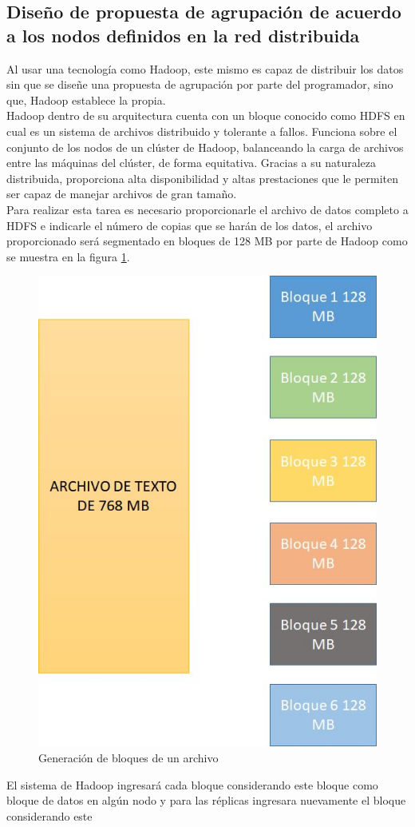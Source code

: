 \subsection{Diseño de propuesta de agrupación de acuerdo a los nodos definidos en la red distribuida}

Al usar una tecnología como Hadoop, este mismo es capaz de distribuir los datos sin que se diseñe una
propuesta de agrupación por parte del programador, sino que, Hadoop establece la propia.
\\
Hadoop dentro de su arquitectura cuenta con un bloque conocido como HDFS en cual es un sistema de archivos distribuido y tolerante a fallos. Funciona sobre el conjunto de los nodos
de un clúster de Hadoop, balanceando la carga de archivos entre las máquinas del clúster,
de forma equitativa. Gracias a su naturaleza distribuida, proporciona alta disponibilidad y
altas prestaciones que le permiten ser capaz de manejar archivos de gran tamaño.
\\
Para realizar esta tarea es necesario proporcionarle el archivo de datos completo a HDFS e indicarle el número de copias que se harán de los datos, el archivo proporcionado será segmentado en bloques de 128 MB por parte de Hadoop como se muestra en la figura \ref{fig:red2}.
\begin{figure}[!htbp]
	\hypertarget{fig:red2}{\hspace{1pt}}
	\begin{center}
		\includegraphics[width=.4\textwidth]{capitulo3/images/im2.png}
		\caption{Generación de bloques de un archivo}
		\label{fig:red2}
	\end{center}
\end{figure}
\newpage
El sistema de Hadoop ingresará cada bloque considerando este bloque como bloque de
datos en algún nodo y para las réplicas ingresara nuevamente el bloque considerando este
